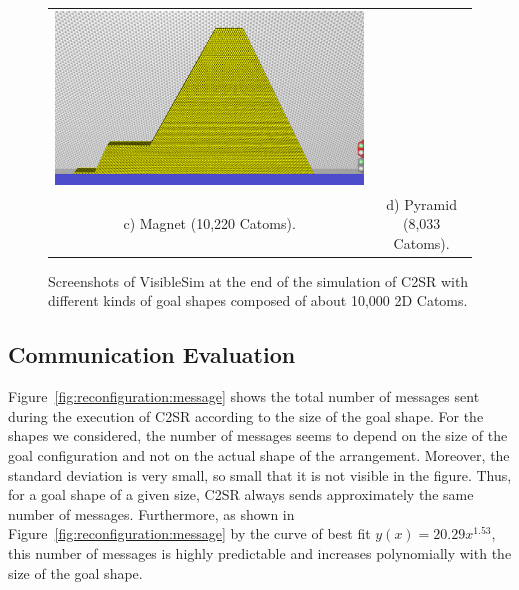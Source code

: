 {\begin{figure}[h!]
\begin{tabular}{c c}
			\includegraphics[width=\mySubfigureWidth,height=\mySubfigureHeight]{images/reconfiguration/pyramid-8033.png} \\
			c) Magnet (10,220 Catoms). & d) Pyramid (8,033 Catoms).\\
		\end{tabular}
		\caption{Screenshots of VisibleSim at the end of the simulation of C2SR with different kinds of goal shapes composed of about 10,000 2D Catoms.\label{fig:reconfiguration:shapes}}
	\end{figure}
}

\subsection{Communication Evaluation}


Figure~\ref{fig:reconfiguration:message} shows the total number of messages sent during the execution of C2SR according to the size of the goal shape. For the shapes we considered, the number of messages seems to depend on the size of the goal configuration and not on the actual shape of the arrangement. Moreover, the standard deviation is very small, so small that it is not visible in the figure. Thus, for a goal shape of a given size, C2SR always sends approximately the same number of messages. Furthermore, as shown in Figure~\ref{fig:reconfiguration:message} by the curve of best fit $y(x) = 20.29x^{1.53}$, this number of messages is highly predictable and increases polynomially with the size of the goal shape.

